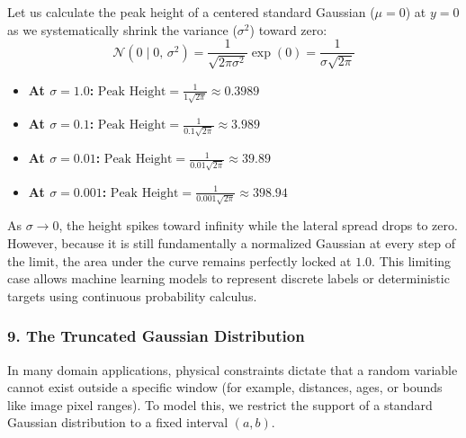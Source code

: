 \documentclass{article}
\begin{document}
\begin{tcolorbox}[colback=blue!5!white, colframe=blue!60!black, title=Numerical Intuition: The Vanishing Variance Spike]
Let us calculate the peak height of a centered standard Gaussian ($\mu=0$) at $y=0$ as we systematically shrink the variance ($\sigma^2$) toward zero:
\begin{equation*}
    \mathcal{N}(0 \mid 0, \, \sigma^2) = \frac{1}{\sqrt{2\pi\sigma^2}} \exp(0) = \frac{1}{\sigma\sqrt{2\pi}}
\end{equation*}
\begin{itemize}
    \item \textbf{At $\sigma = 1.0$:} $\text{Peak Height} = \frac{1}{1\sqrt{2\pi}} \approx \mathbf{0.3989}$
    \item \textbf{At $\sigma = 0.1$:} $\text{Peak Height} = \frac{1}{0.1\sqrt{2\pi}} \approx \mathbf{3.989}$
    \item \textbf{At $\sigma = 0.01$:} $\text{Peak Height} = \frac{1}{0.01\sqrt{2\pi}} \approx \mathbf{39.89}$
    \item \textbf{At $\sigma = 0.001$:} $\text{Peak Height} = \frac{1}{0.001\sqrt{2\pi}} \approx \mathbf{398.94}$
\end{itemize}
As $\sigma \to 0$, the height spikes toward infinity while the lateral spread drops to zero. However, because it is still fundamentally a normalized Gaussian at every step of the limit, the area under the curve remains perfectly locked at $1.0$. This limiting case allows machine learning models to represent discrete labels or deterministic targets using continuous probability calculus.
\end{tcolorbox}

\subsubsection*{9. The Truncated Gaussian Distribution}
In many domain applications, physical constraints dictate that a random variable cannot exist outside a specific window (for example, distances, ages, or bounds like image pixel ranges). To model this, we restrict the support of a standard Gaussian distribution to a fixed interval $(a, b)$. 
\end{document}
